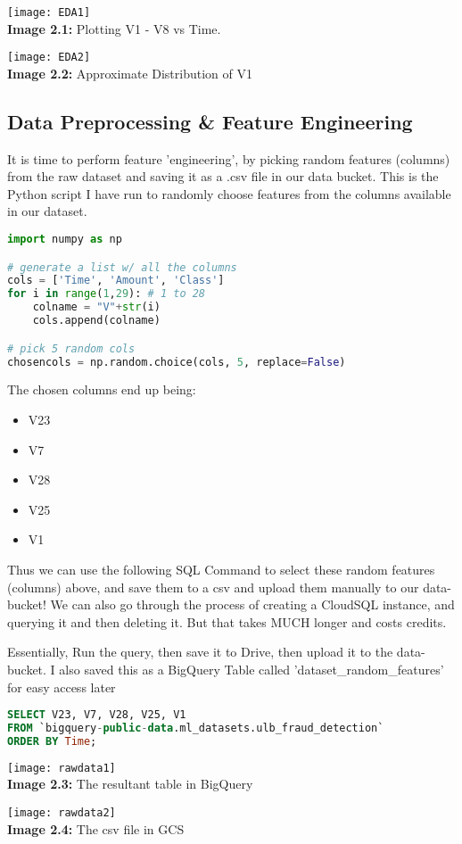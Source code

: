 \documentclass[]{report}
\begin{document}
\begin{center}
\texttt{[image: EDA1]} \\
\textbf{Image 2.1:} Plotting V1 - V8 vs Time.
\end{center}
\begin{center}
	\texttt{[image: EDA2]} \\
	\textbf{Image 2.2:} Approximate Distribution of V1
\end{center}

\subsection*{Data Preprocessing \& Feature Engineering}

It is time to perform feature 'engineering', by picking random features (columns) from the raw dataset and saving it as a .csv file in our data bucket.
This is the Python script I have run to randomly choose features from the columns available in our dataset.

\begin{lstlisting}[language=Python]
import numpy as np

# generate a list w/ all the columns
cols = ['Time', 'Amount', 'Class']
for i in range(1,29): # 1 to 28
	colname = "V"+str(i)
	cols.append(colname)

# pick 5 random cols
chosencols = np.random.choice(cols, 5, replace=False)
\end{lstlisting}
The chosen columns end up being:
\begin{itemize}
	\item V23
	\item V7	
	\item V28
	\item V25
	\item V1
\end{itemize}
Thus we can use the following SQL Command to select these random features (columns) above, and save them to a csv and upload them manually to our data-bucket! We can also go through the process of creating a CloudSQL instance, and querying it and then deleting it. But that takes MUCH longer and costs credits.

Essentially, Run the query, then save it to Drive, then upload it to the data-bucket. I also saved this as a BigQuery Table called 'dataset\_random\_features' for easy access later

\begin{lstlisting}[language=SQL]
SELECT V23, V7, V28, V25, V1
FROM `bigquery-public-data.ml_datasets.ulb_fraud_detection`
ORDER BY Time;
\end{lstlisting}

\begin{center}
	\texttt{[image: rawdata1]} \\
	\textbf{Image 2.3:} The resultant table in BigQuery
\end{center}
\begin{center}
	\texttt{[image: rawdata2]} \\
	\textbf{Image 2.4:} The csv file in GCS
\end{center}	
\end{document}
